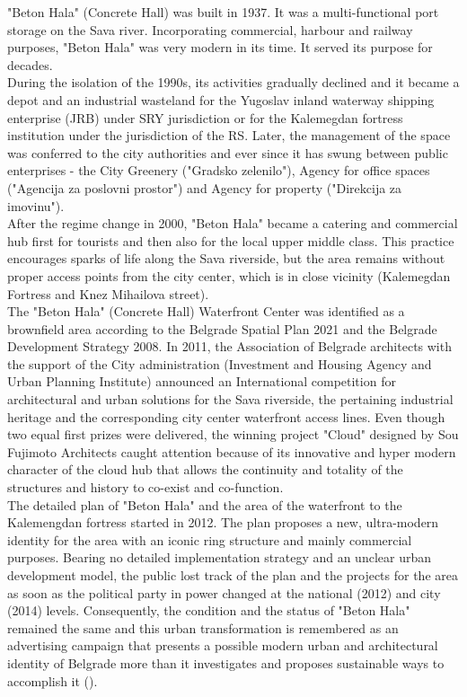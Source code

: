 \documentclass[11pt]{report}
\begin{document}
{{{{\begin{itemize}
"Beton Hala" (Concrete Hall) was built in 1937. It was a multi-functional port storage on the Sava river. Incorporating commercial, harbour and railway purposes, "Beton Hala" was very modern in its time. It served its purpose for decades. 
\\

During the isolation of the 1990s, its activities gradually declined and it became a depot and an industrial wasteland for the Yugoslav inland waterway shipping enterprise (JRB) under SRY jurisdiction or for the Kalemegdan fortress institution under the jurisdiction of the RS. Later, the management of the space was conferred to the city authorities and ever since it has swung between public enterprises - the City Greenery ("Gradsko zelenilo"), Agency for office spaces ("Agencija za poslovni prostor") and   Agency for property ("Direkcija za imovinu").
\\

After the regime change in 2000, "Beton Hala" became a catering and commercial hub first for tourists and then also for the local upper middle class. This practice encourages sparks of life along the Sava riverside, but the area remains without proper access points from the city center, which is in close vicinity (Kalemegdan Fortress and Knez Mihailova street).
\\

The "Beton Hala" (Concrete Hall) Waterfront Center was identified as a brownfield area according to the Belgrade Spatial Plan 2021  and  the Belgrade  Development  Strategy 2008. In 2011, the Association of Belgrade architects with the support of the City administration (Investment and Housing Agency and Urban Planning Institute) announced an International competition for architectural and urban solutions for the Sava riverside, the pertaining industrial heritage and the corresponding city  center waterfront  access lines. Even though two equal first prizes were delivered, the winning project "Cloud" designed by Sou Fujimoto  Architects  caught  attention because of  its  innovative and hyper modern character of the cloud hub that allows the continuity and totality of the  structures  and  history  to  co-exist  and  co-function.
\\

The detailed plan of "Beton Hala" and the area of the waterfront to the Kalemengdan fortress started in 2012. The plan proposes a new, ultra-modern identity for the area with an iconic ring structure and mainly commercial purposes. Bearing no detailed implementation strategy and an unclear urban development model, the public lost track of the plan and the projects for the area as soon as the political party in power changed at the national (2012) and city (2014) levels. Consequently, the condition and the status of "Beton Hala" remained the same and this urban transformation is remembered as an advertising campaign that presents a possible modern urban and architectural identity of Belgrade more than it investigates and proposes sustainable ways to accomplish it (\href{Vukmirovic}{\citealt{doytchinov_belgrade:_2015}}).


\end{itemize}}}}}
\end{document}
